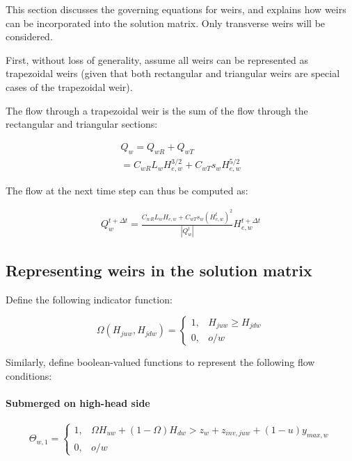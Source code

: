 \documentclass[11pt]{article}
\begin{document}
This section discusses the governing equations for weirs, and explains how weirs
can be incorporated into the solution matrix. Only transverse weirs will be considered.

First, without loss of generality, assume all weirs can be represented as
trapezoidal weirs (given that both rectangular and triangular weirs are special
cases of the trapezoidal weir).

The flow through a trapezoidal weir is the sum of the flow through the
rectangular and triangular sections:

\begin{align}
  Q_w = Q_{wR} + Q_{wT} \\
  = C_{wR} L_{w} H_{e,w}^{3/2} + C_{wT} s_{w} H_{e,w}^{5/2}
\end{align}

The flow at the next time step can thus be computed as:

\begin{align}
  Q_w^{t + \Delta t} = \frac{C_{wR} L_{w} H_{e,w} + C_{wT} s_{w} (H_{e,w}^{t})^2}{|Q_{w}^t|} H_{e,w}^{t + \Delta t}
\end{align}

\subsection*{Representing weirs in the solution matrix}

Define the following indicator function:

\begin{equation}
  \Omega(H_{juw}, H_{jdw}) = 
  \begin{cases}
    1, & H_{juw} \geq H_{jdw} \\
    0, & o/w
  \end{cases}
\end{equation}

Similarly, define boolean-valued functions to represent the following flow conditions:

\paragraph{Submerged on high-head side}

\begin{equation}
  \Theta_{w,1} =
  \begin{cases}
    1, &   \Omega H_{uw} + (1 - \Omega) H_{dw} > z_w + z_{inv,juw} + (1 - u) y_{max,w} \\
    0, & o/w
  \end{cases}
\end{equation}
\end{document}
